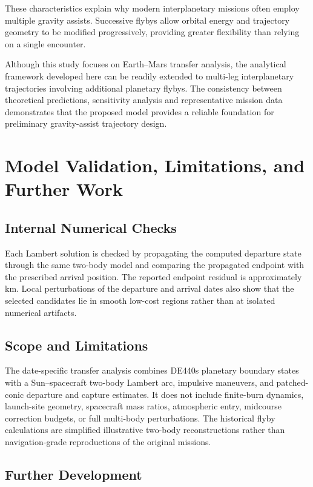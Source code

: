 \documentclass[11pt,a4paper]{article}
\begin{document}
These characteristics explain why modern interplanetary missions often employ multiple gravity assists. Successive flybys allow orbital energy and trajectory geometry to be modified progressively, providing greater flexibility than relying on a single encounter.

Although this study focuses on Earth--Mars transfer analysis, the analytical framework developed here can be readily extended to multi-leg interplanetary trajectories involving additional planetary flybys. The consistency between theoretical predictions, sensitivity analysis and representative mission data demonstrates that the proposed model provides a reliable foundation for preliminary gravity-assist trajectory design.

\section{Model Validation, Limitations, and Further Work}
\label{sec:validation-limitations}

\subsection{Internal Numerical Checks}

Each Lambert solution is checked by propagating the computed departure state
through the same two-body model and comparing the propagated endpoint with the
prescribed arrival position. The reported endpoint residual is approximately
\LambertEndpointError{} km. Local perturbations of the departure and arrival
dates also show that the selected candidates lie in smooth low-cost regions
rather than at isolated numerical artifacts.

\subsection{Scope and Limitations}

The date-specific transfer analysis combines DE440s planetary boundary states
with a Sun--spacecraft two-body Lambert arc, impulsive maneuvers, and
patched-conic departure and capture estimates. It does not include finite-burn
dynamics, launch-site geometry, spacecraft mass ratios, atmospheric entry,
midcourse correction budgets, or full multi-body perturbations. The historical
flyby calculations are simplified illustrative two-body reconstructions rather than
navigation-grade reproductions of the original missions.

\subsection{Further Development}
\end{document}

